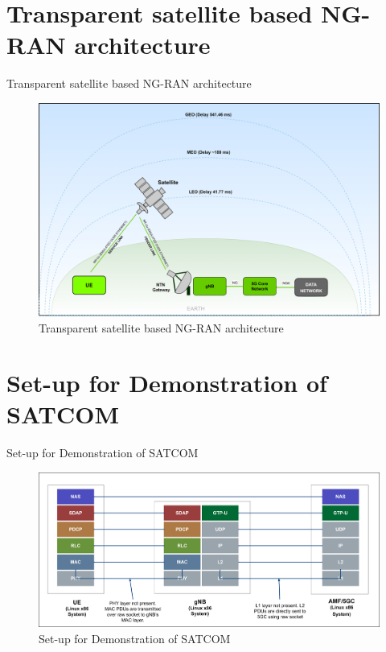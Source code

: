 \documentclass[xcolor=table]{beamer}
\begin{document}
\section{Transparent satellite based NG-RAN architecture}
\begin{frame}{Transparent satellite based NG-RAN architecture}
    \begin{figure}[h!]
  		\centering
  		\includegraphics[width=\linewidth]{./figs/SATCOM_figure.png}
  		\caption{Transparent satellite based NG-RAN architecture}
  		\label{SATCOM_figure}
	\end{figure}
  
\end{frame} 


\section{Set-up for Demonstration of SATCOM}
\begin{frame}{Set-up for Demonstration of SATCOM}
    \begin{figure}[h!]
  		\centering
  		\includegraphics[width=\linewidth]{./figs/SATCOM_setup.png}
  		\caption{Set-up for Demonstration of SATCOM}
  		\label{SATCOM_setup}
	\end{figure}
\end{frame} 
\end{document}
